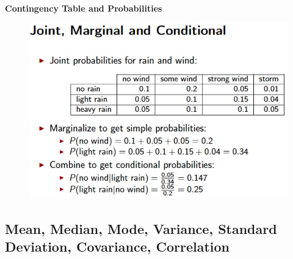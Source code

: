 \documentclass{beamer}
\begin{document}
\begin{frame}[plain]
\begin{figure}%
\end{figure}
\end{frame}


\begin{frame}\textbf{Contingency Table and Probabilities}
\begin{figure}
\includegraphics[scale=0.5]{JointMarginalConditional} 
\end{figure}
\end{frame}


\subsection{Mean, Median, Mode, Variance, Standard Deviation, Covariance, Correlation}
\end{document}
